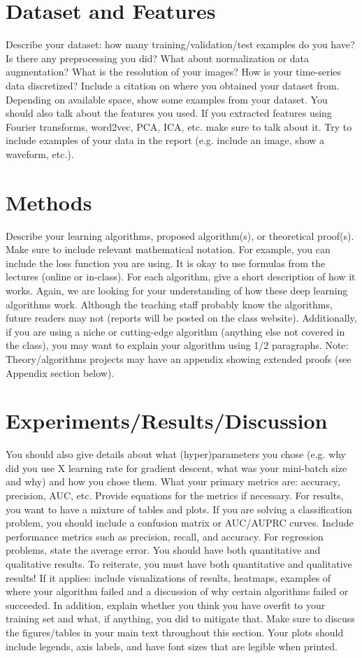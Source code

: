 \documentclass{article}
\begin{document}
\section{Dataset and Features}
Describe your dataset: how many training/validation/test examples do you have? Is there
any preprocessing you did? What about normalization or data augmentation? What is the
resolution of your images? How is your time-series data discretized? Include a citation on
where you obtained your dataset from. Depending on available space, show some examples
from your dataset. You should also talk about the features you used. If you extracted
features using Fourier transforms, word2vec, PCA,
ICA, etc. make sure to talk about it. Try to include examples of your data in the report
(e.g. include an image, show a waveform, etc.).



\section{ Methods }
Describe your learning algorithms, proposed algorithm(s), or theoretical proof(s). Make
sure to include relevant mathematical notation. For example, you can include the loss function you are using. It is okay to use formulas from the lectures (online or in-class). For each algorithm, give a short description 
of how it works. Again, we are looking for your understanding of how these deep
learning algorithms work. Although the teaching staff probably know the algorithms, future
readers may not (reports will be posted on the class website). Additionally, if you are
using a niche or cutting-edge algorithm (anything else not covered in the class), you may want to explain your algorithm using 1/2
paragraphs. Note: Theory/algorithms projects may have an appendix showing extended
proofs (see Appendix section below).

\section{Experiments/Results/Discussion}
You should also give details about what (hyper)parameters you chose (e.g. why did you
use X learning rate for gradient descent, what was your mini-batch size and why) and how
you chose them. What your primary metrics are: accuracy, precision,
AUC, etc. Provide equations for the metrics if necessary. For results, you want to have a
mixture of tables and plots. If you are solving a classification problem, you should include a
confusion matrix or AUC/AUPRC curves. Include performance metrics such as precision,
recall, and accuracy. For regression problems, state the average error. You should have
both quantitative and qualitative results. To reiterate, you must have both quantitative
and qualitative results! If it applies: include visualizations of results, heatmaps,
examples of where your algorithm failed and a discussion of why certain algorithms failed
or succeeded. In addition, explain whether you think you have overfit to your training set
and what, if anything, you did to mitigate that. Make sure to discuss the figures/tables in
your main text throughout this section. Your plots should include legends, axis labels, and
have font sizes that are legible when printed.
\end{document}
